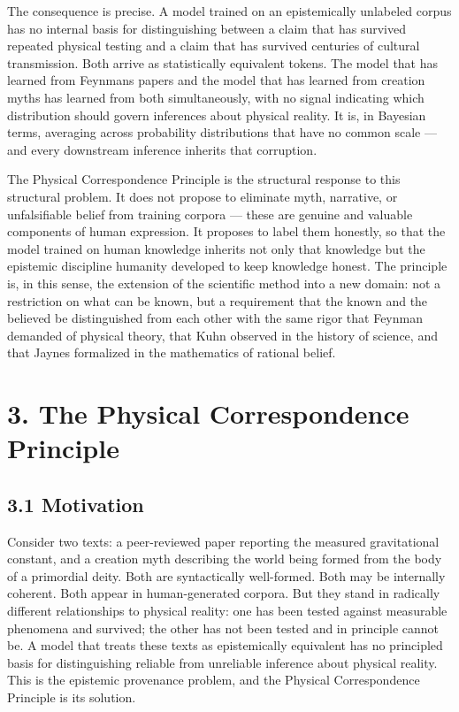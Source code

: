 \documentclass[
]{article}
\begin{document}
The consequence is precise. A model trained on an epistemically
unlabeled corpus has no internal basis for distinguishing between a
claim that has survived repeated physical testing and a claim that has
survived centuries of cultural transmission. Both arrive as
statistically equivalent tokens. The model that has learned from
Feynman\textquotesingle s papers and the model that has learned from
creation myths has learned from both simultaneously, with no signal
indicating which distribution should govern inferences about physical
reality. It is, in Bayesian terms, averaging across probability
distributions that have no common scale --- and every downstream
inference inherits that corruption.

The Physical Correspondence Principle is the structural response to this
structural problem. It does not propose to eliminate myth, narrative, or
unfalsifiable belief from training corpora --- these are genuine and
valuable components of human expression. It proposes to label them
honestly, so that the model trained on human knowledge inherits not only
that knowledge but the epistemic discipline humanity developed to keep
knowledge honest. The principle is, in this sense, the extension of the
scientific method into a new domain: not a restriction on what can be
known, but a requirement that the known and the believed be
distinguished from each other with the same rigor that Feynman demanded
of physical theory, that Kuhn observed in the history of science, and
that Jaynes formalized in the mathematics of rational belief.

\section{\texorpdfstring{\textbf{3. The Physical Correspondence
Principle}}{3. The Physical Correspondence Principle}}\label{the-physical-correspondence-principle}

\subsection{3.1 Motivation}\label{motivation}

Consider two texts: a peer-reviewed paper reporting the measured
gravitational constant, and a creation myth describing the world being
formed from the body of a primordial deity. Both are syntactically
well-formed. Both may be internally coherent. Both appear in
human-generated corpora. But they stand in radically different
relationships to physical reality: one has been tested against
measurable phenomena and survived; the other has not been tested and in
principle cannot be. A model that treats these texts as epistemically
equivalent has no principled basis for distinguishing reliable from
unreliable inference about physical reality. This is the epistemic
provenance problem, and the Physical Correspondence Principle is its
solution.
\end{document}
